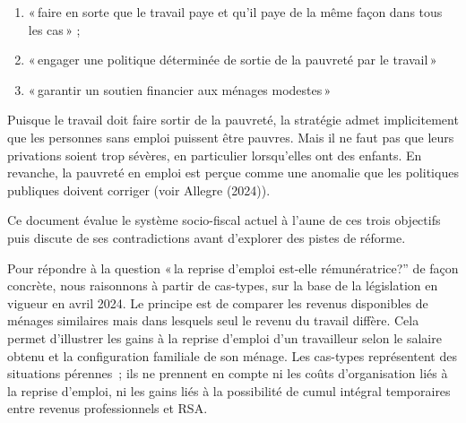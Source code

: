 \documentclass[
  french,
]{article}
\providecommand{\tightlist}{%
  \setlength{\itemsep}{0pt}\setlength{\parskip}{0pt}}
\begin{document}
\begin{enumerate}
\def\labelenumi{\arabic{enumi}.}
\tightlist
\item
  «\,faire en sorte que le travail paye et qu'il paye de la même façon
  dans tous les cas\,» ;
\item
  «\,engager une politique déterminée de sortie de la pauvreté par le
  travail\,»
\item
  «\,garantir un soutien financier aux ménages modestes\,»
\end{enumerate}

Puisque le travail doit faire sortir de la pauvreté, la stratégie admet
implicitement que les personnes sans emploi puissent être pauvres. Mais
il ne faut pas que leurs privations soient trop sévères, en particulier
lorsqu'elles ont des enfants. En revanche, la pauvreté en emploi est
perçue comme une anomalie que les politiques publiques doivent corriger
(voir Allegre (2024)).

Ce document évalue le système socio-fiscal actuel à l'aune de ces trois
objectifs puis discute de ses contradictions avant d'explorer des pistes
de réforme.

Pour répondre à la question «\,la reprise d'emploi est-elle
rémunératrice?'' de façon concrète, nous raisonnons à partir de
cas-types, sur la base de la législation en vigueur en avril 2024. Le
principe est de comparer les revenus disponibles de ménages similaires
mais dans lesquels seul le revenu du travail diffère. Cela permet
d'illustrer les gains à la reprise d'emploi d'un travailleur selon le
salaire obtenu et la configuration familiale de son ménage. Les
cas-types représentent des situations pérennes~; ils ne prennent en
compte ni les coûts d'organisation liés à la reprise d'emploi, ni les
gains liés à la possibilité de cumul intégral temporaires entre revenus
professionnels et RSA.~
\end{document}
